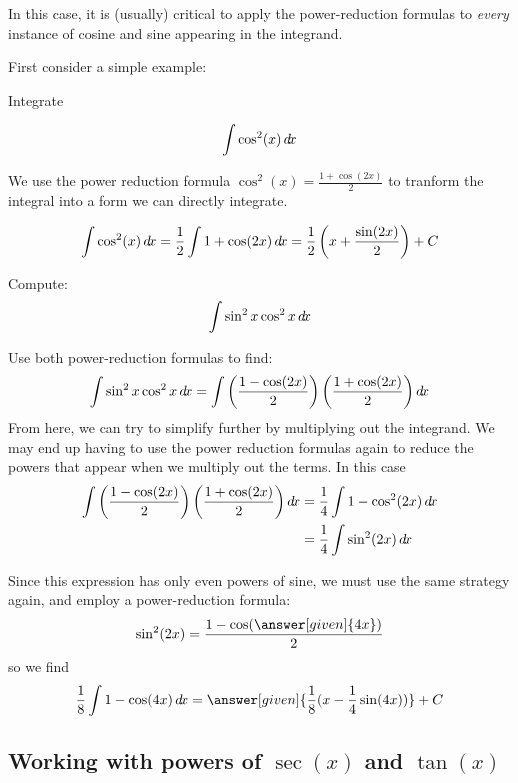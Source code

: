 \documentclass{ximera}
\begin{document}
In this case, it is (usually) critical to apply the power-reduction
formulas to \textit{every} instance of cosine and sine appearing in
the integrand.

First consider a simple example:

\begin{example}
Integrate 

\[ 
\int \cos^{2}(x) \mathop{}\!d\! x
\]

\begin{explanation}
We use the power reduction formula $\cos^{2}(x)=\frac{1+\cos(2x)}{2}$ to tranform the integral into a form we can directly 
integrate.

\[
\int \cos^{2} (x) \mathop{}\!d\! x= \frac{1}{2} \int 1+\cos(2x) \mathop{}\!d\! x = \frac{1}{2} \left( x+ \frac{ \sin(2x)}{2} \right) + C
\]


\end{explanation}
\end{example}


\begin{example}
  Compute:
  \[
  \int \sin^2x\cos^2x\mathop{}\!d\! x
  \]
  \begin{explanation} 
    Use both power-reduction formulas to find:
    \[
    \int \sin^2x\cos^2x\mathop{}\!d\! x=\int \left( \frac{1-\cos(2x)}{2}\right)
    \left(\frac{1+\cos(2x)}{2}\right) \mathop{}\!d\! x
    \]
    From here, we can try to simplify further by multiplying out the integrand. We may end up having to
    use the power reduction formulas again to reduce the powers that appear when we multiply out the terms.  In this case
    \begin{align*}
      \int \left(\frac{1-\cos(2x)}{2}\right) \left( \frac{1+\cos(2x)}{2}\right) \mathop{}\!d\! x &= \frac{1}{4} \int 1-\cos^2(2x) \mathop{}\!d\! x\\
      &= \frac{1}{4} \int \sin^2(2x) \mathop{}\!d\! x
    \end{align*}
    
    Since this expression has only even powers of sine, we must use
    the same strategy again, and employ a power-reduction formula:
    \[
    \sin^2(2x) = \frac{1-\cos(\answer[given]{4x})}{2}
    \]
    so we find
    \[
    \frac{1}{8}\int 1-\cos(4x) \d x = \answer[given]{\frac{1}{8}(x - \frac{1}{4}\sin(4x))} + C
    \]
  \end{explanation}
\end{example}




\subsection{Working with powers of $\sec(x)$ and $\tan(x)$}
\end{document}
